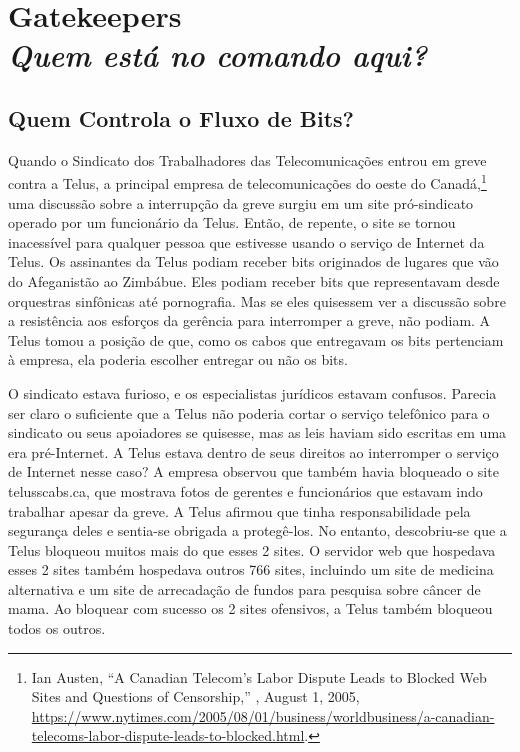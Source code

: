 \chapter[Gatekeepers]{Gatekeepers\\\large\textit{Quem está no comando aqui?}}
\label{gatekeepers}

\section{Quem Controla o Fluxo de Bits?}
\label{gatekeepers:fluxo-bits}

Quando o Sindicato dos Trabalhadores das Telecomunicações entrou em greve contra
a Telus, a principal empresa de telecomunicações do oeste do Canadá,\footnote{Ian
Austen, ``A Canadian Telecom's Labor Dispute Leads to Blocked Web Sites and
Questions of Censorship,'' , August 1, 2005,
\url{https://www.nytimes.com/2005/08/01/business/worldbusiness/a-canadian-telecoms-labor-dispute-leads-to-blocked.html}.}
uma discussão sobre a interrupção da greve surgiu em um site pró-sindicato
operado por um funcionário da Telus. Então, de repente, o site se tornou
inacessível para qualquer pessoa que estivesse usando o serviço de Internet da
Telus. Os assinantes da Telus podiam receber bits originados de lugares que vão
do Afeganistão ao Zimbábue. Eles podiam receber bits que representavam desde
orquestras sinfônicas até pornografia. Mas se eles quisessem ver a discussão
sobre a resistência aos esforços da gerência para interromper a greve, não podiam.
A Telus tomou a posição de que, como os cabos que entregavam os bits pertenciam à
empresa, ela poderia escolher entregar ou não os bits.

O sindicato estava furioso, e os especialistas jurídicos estavam confusos. Parecia
ser claro o suficiente que a Telus não poderia cortar o serviço telefônico para o
sindicato ou seus apoiadores se quisesse, mas as leis haviam sido escritas em uma
era pré-Internet. A Telus estava dentro de seus direitos ao interromper o serviço
de Internet nesse caso? A empresa observou que também havia bloqueado o site
telusscabs.ca, que mostrava fotos de gerentes e funcionários que estavam indo
trabalhar apesar da greve. A Telus afirmou que tinha responsabilidade pela
segurança deles e sentia-se obrigada a protegê-los. No entanto, descobriu-se que a
Telus bloqueou muitos mais do que esses 2 sites. O servidor web que hospedava esses
2 sites também hospedava outros 766 sites, incluindo um site de medicina
alternativa e um site de arrecadação de fundos para pesquisa sobre câncer de mama. Ao
bloquear com sucesso os 2 sites ofensivos, a Telus também bloqueou todos os outros.


